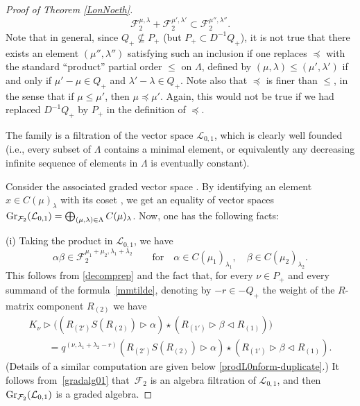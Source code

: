 \documentclass[10pt,a4paper]{amsart}
\numberwithin{equation}{section}
\theoremstyle{definition}
\newcommand{\Ll}{{\mathcal L}}
\begin{document}
\begin{proof}[Proof of Theorem \ref{LonNoeth}]
\[{\mathcal F}_2^{\mu,\lambda}+ {\mathcal F}_2^{\mu',\lambda'} \subset {\mathcal F}_2^{\mu'',\lambda''}.\]
Note that in general, since $Q_+\nsubseteq P_+$ (but $P_+\subset D^{-1}Q_+$), it is not true that there exists an element $(\mu'',\lambda'')$ satisfying such an inclusion if one replaces $\preceq$ with the standard ``product'' partial order $\leq$ on $\Lambda$, defined by $(\mu,\lambda)\leq (\mu', \lambda')$ if and only if $\mu'-\mu\in Q_+$ and $\lambda'-\lambda\in Q_+$. Note also that $\preceq$ is finer than $\leq$, in the sense that if $\mu \leq \mu'$, then $\mu\preceq \mu'$. Again, this would not be true if we had replaced $D^{-1}Q_+$ by $P_+$ in the definition of $\preceq$.

The family  is a filtration of the vector space $ {\mathcal L}_{0,1}$, which is clearly well founded (i.e., every subset of $\Lambda$ contains a minimal element, or equivalently any decreasing infinite sequence of elements in $\Lambda$ is eventually constant).

Consider the associated graded vector space . By identifying an element $x\in C(\mu)_\lambda$ with its coset , we get an equality of vector spaces $ {\rm Gr}_{{\mathcal F}_2}({\mathcal L}_{0,1})= \bigoplus_{(\mu,\lambda)\in \Lambda} C(\mu)_\lambda$. Now, one has the following facts:

(i) Taking the product in $\Ll_{0,1}$, we have
\begin{equation}\label{gradalg01}
\alpha \beta\in {\mathcal F}_2^{\mu_1+\mu_2,\lambda_1+\lambda_2}\qquad \mathrm{for}\quad \alpha \in C(\mu_1)_{\lambda_1},\quad \beta \in C(\mu_2)_{\lambda_2}.
\end{equation}
This follows from \eqref{decomprep} and the fact that, for every $\nu\in P_+$ and every summand of the formula~\eqref{mmtilde}, denoting by $-r\in -Q_+$ the weight of the $R$-matrix component $R_{(2)}$ we have
\begin{gather*}%
K_\nu\rhd \bigl((R_{(2')}{S}(R_{(2)}) \rhd \alpha) \star (R_{(1')}\rhd \beta \lhd R_{(1)})\bigr) \\
\qquad= q^{(\nu,\lambda_1+\lambda_2-r)}(R_{(2')}{S}(R_{(2)}) \rhd \alpha) \star (R_{(1')}\rhd \beta \lhd R_{(1)}).
\end{gather*}
(Details of a similar computation are given below \eqref{prodL0nform-duplicate}.) It follows from~\eqref{gradalg01} that~$\mathcal{F}_2$ is an algebra filtration of $\Ll_{0,1}$, and then ${\rm Gr}_{\mathcal F_2}({\mathcal L}_{0,1})$ is a graded algebra.


\end{proof}
\end{document}
